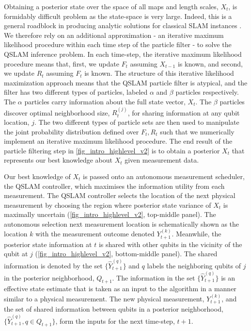 \documentclass[reprint,longbibliography]{revtex4-1} %
\begin{document}
Obtaining a posterior state over the space of all maps and length scales, $X_t$, is formidably difficult problem as the state-space is very large. Indeed, this is a general roadblock in producing analytic solutions for classical SLAM instances \cite{thrun2005probabilistic,thrun2001probabilistic}. We therefore rely on an additional approximation - an iterative maximum likelihood procedure within each time step of the particle filter - to solve the QSLAM inference problem. In each time-step, the iterative maximum likelihood procedure means that, first, we update $F_t$ assuming $X_{t-1}$ is known, and second, we update $R_t$ assuming $F_t$ is known. The structure of this iterative likelihood maximization approach means that the QSLAM particle filter is atypical, and the filter has two different types of particles, labeled $\alpha$ and $\beta$ particles respectively.  The $\alpha$ particles carry information about the full state vector, $X_t$. The $\beta$ particles discover optimal neighborhood size, $R_t^{(j)}$, for sharing information at any qubit location, $j$.  The two different types of particle sets are then used to manipulate the joint probability distribution defined over $F_t, R_t$ such that we numerically implement an iterative maximum likelihood procedure. The end result of the particle filtering step in \cref{fig_intro_highlevel_v2} is to obtain a posterior $X_t$ that represents our best knowledge about $X_t$ given measurement data.

Our best knowledge of $X_t$ is passed onto an autonomous measurement scheduler, the QSLAM controller, which maximises the information utility from each measurement. The QSLAM controller selects the location of the next physical measurement by choosing the region where posterior state variance of $X_t$ is maximally uncertain (\cref{fig_intro_highlevel_v2}, top-middle panel). The autonomous selection next measurement location is schematically shown as the location $k$ with the measurement outcome denoted $Y_{t+1}^{(k)}$. Meanwhile, the posterior state information at $t$ is shared with other qubits in the vicinity of the qubit at $j$ (\cref{fig_intro_highlevel_v2}, bottom-middle panel).  The shared information is denoted by the set $\{\hat{Y}_{t+1}^{(q)} \}$ and $q$ labels the neighboring qubits of $j$ in the posterior neighborhood, $Q_{t+1}$. The information in the set $\{\hat{Y}_{t+1}^{(q)} \}$  is an effective state estimate that is taken as an input to the algorithm in a manner similar to a physical measurement. The new physical measurement, $Y_{t+1}^{(k)}$,  and the set of shared information between qubits in a posterior neighborhood, $\{\hat{Y}_{t+1}^{(q)}, q \in Q_{t+1}\}$, form the inputs for the next time-step, $t+1$. 
\end{document}
